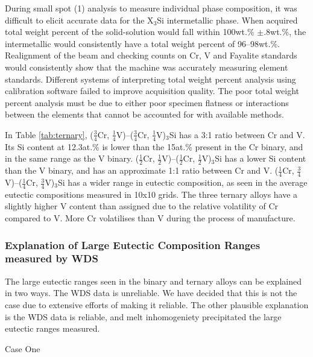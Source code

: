 During small spot (1\micro\metre) analysis to measure individual phase composition, it was difficult to elicit accurate data for the X$_3$Si intermetallic phase.  When acquired total weight percent of the solid-solution would fall within 100wt.\% $\pm$.8wt.\%, the intermetallic would consistently have a total weight percent of 96--98wt.\%.  Realignment of the beam and checking counts on Cr, V and Fayalite standards would consistently show that the machine was accurately measuring element standards.  Different systems of interpreting total weight percent analysis using calibration software failed to improve acquisition quality.  The poor total weight percent analysis must be due to either poor specimen flatness or interactions between the elements that cannot be accounted for with available methods.

In Table \ref{tab:ternary}, ($\frac{3}{4}$Cr, $\frac{1}{4}$V)--($\frac{3}{4}$Cr, $\frac{1}{4}$V)$_3$Si has a 3:1 ratio between Cr and V.  Its Si content at 12.3at.\% is lower than the 15at.\% present in the Cr binary, and in the same range as the V binary.  ($\frac{1}{2}$Cr, $\frac{1}{2}$V)--($\frac{1}{2}$Cr, $\frac{1}{2}$V)$_3$Si has a lower Si content than the V binary, and has an approximate 1:1 ratio between Cr and V.  ($\frac{1}{4}$Cr, $\frac{3}{4}$V)--($\frac{1}{4}$Cr, $\frac{3}{4}$V)$_3$Si has a wider range in eutectic composition, as seen in the average eutectic compositions measured in 10x10 grids.  The three ternary alloys have a slightly higher V content than assigned due to the relative volatility of Cr compared to V.  More Cr volatilises than V during the process of manufacture.   

\subsubsection{Explanation of Large Eutectic Composition Ranges measured by WDS}

The large eutectic ranges seen in the binary and ternary alloys can be explained in two ways.  The WDS data is unreliable.  We have decided that this is not the case due to extensive efforts of making it reliable.  The other plausible explanation is the WDS data is reliable, and melt inhomogeniety precipitated the large eutectic ranges measured.

 
Case One

